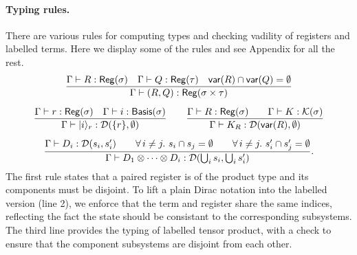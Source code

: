 \paragraph*{Typing rules.}
There are various rules for computing types and checking vadility of registers and labelled terms. Here we display some of the rules and see Appendix for all the rest.
\begin{gather*}
  \frac{
      \Gamma \vdash R : \mathsf{Reg}(\sigma) \quad
      \Gamma \vdash Q : \mathsf{Reg}(\tau)
      \quad \mathsf{var}(R) \cap \mathsf{var}(Q) = \emptyset
  }{\Gamma \vdash (R,Q) : \mathsf{Reg}(\sigma \times \tau)} \\[0.2cm]
  \frac{
          \Gamma \vdash r : \mathsf{Reg}(\sigma) \quad
          \Gamma \vdash i : \mathsf{Basis}(\sigma)}
  {\Gamma \vdash |i\rangle_r : \mathcal{D}(\{r\}, \emptyset)}
  \qquad
  \frac{\Gamma \vdash R : \mathsf{Reg}(\sigma)\qquad \Gamma \vdash K : \mathcal{K}(\sigma)}{\Gamma \vdash K_R : \mathcal{D}(\mathsf{var}(R), \emptyset)} \\[0.2cm]
    \frac{
        \Gamma \vdash D_i : \mathcal{D}(s_i,s_i') \qquad
        \forall\,i\neq j.\ s_i\cap s_j = \emptyset \qquad
        \forall\,i\neq j.\ s'_i\cap s'_j = \emptyset
    }
    {\Gamma \vdash D_1 \otimes \cdots \otimes D_i : \mathcal{D}(\bigcup_i s_i, \bigcup_i s_i')}.
\end{gather*}
The first rule states that a paired register is of the product type and its components must be disjoint.
To lift a plain Dirac notation into the labelled version (line 2), we enforce that the term and register share the same indices, reflecting the fact the state should be consistant to the corresponding subsystems.
The third line provides the typing of labelled tensor product, with a check to ensure that the component subsystems are disjoint from each other.


